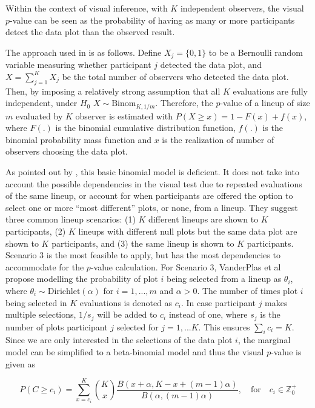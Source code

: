 \documentclass[]{interact}
\theoremstyle{plain}%
\theoremstyle{definition}
\theoremstyle{remark}
\begin{document}
Within the context of visual inference, with \(K\) independent
observers, the visual \(p\)-value can be seen as the probability of
having as many or more participants detect the data plot than the
observed result.

The approach used in \citet{majumder2013validation} is as follows.
Define \(X_j = \{0,1\}\) to be a Bernoulli random variable measuring
whether participant \(j\) detected the data plot, and
\(X = \sum_{j=1}^{K}X_j\) be the total number of observers who detected
the data plot. Then, by imposing a relatively strong assumption that all
\(K\) evaluations are fully independent, under \(H_0\)
\(X \sim \mathrm{Binom}_{K,1/m}\). Therefore, the \(p\)-value of a
lineup of size \(m\) evaluated by \(K\) observer is estimated with
\(P(X \geq x) = 1 - F(x) + f(x)\), where \(F(.)\) is the binomial
cumulative distribution function, \(f(.)\) is the binomial probability
mass function and \(x\) is the realization of number of observers
choosing the data plot.

As pointed out by \citet{vanderplas2021statistical}, this basic binomial
model is deficient. It does not take into account the possible
dependencies in the visual test due to repeated evaluations of the same
lineup, or account for when participants are offered the option to
select one or more ``most different'' plots, or none, from a lineup.
They suggest three common lineup scenarios: (1) \(K\) different lineups
are shown to \(K\) participants, (2) \(K\) lineups with different null
plots but the same data plot are shown to \(K\) participants, and (3)
the same lineup is shown to \(K\) participants. Scenario 3 is the most
feasible to apply, but has the most dependencies to accommodate for the
\(p\)-value calculation. For Scenario 3, VanderPlas et al propose
modelling the probability of plot \(i\) being selected from a lineup as
\(\theta_i\), where \(\theta_i \sim \text{Dirichlet}(\alpha)\) for
\(i=1,...,m\) and \(\alpha > 0\). The number of times plot \(i\) being
selected in \(K\) evaluations is denoted as \(c_i\). In case participant
\(j\) makes multiple selections, \(1/s_j\) will be added to \(c_i\)
instead of one, where \(s_j\) is the number of plots participant \(j\)
selected for \(j=1,...K\). This ensures \(\sum_{i}c_i=K\). Since we are
only interested in the selections of the data plot \(i\), the marginal
model can be simplified to a beta-binomial model and thus the visual
\(p\)-value is given as

\begin{equation} \label{eq:pvalue-beta-binomial}
P(C \geq c_i) = \sum_{x=c_i}^{K}{K \choose x}\frac{B(x + \alpha, K - x + (m - 1)\alpha)}{B(\alpha, (m-1)\alpha)},\quad \text{for} \quad c_i \in \mathbb{Z}_0^+
\end{equation}
\end{document}
